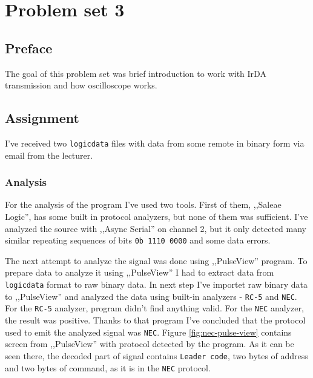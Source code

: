 \section{Problem set 3}
\subsection{Preface}

The goal of this problem set was brief introduction to work with IrDA transmission
and how oscilloscope works.

\subsection{Assignment}

I've received two \texttt{logicdata} files with data from some remote in binary form via email from the lecturer.

\subsubsection{Analysis}

For the analysis of the program I've used two tools. First of them, ,,Saleae Logic'', has some built in protocol analyzers, but none of them was sufficient. I've analyzed the source with ,,Async Serial'' on channel 2, but it only detected many similar repeating sequences of bits \texttt{0b 1110 0000} and some data errors.

The next attempt to analyze the signal was done using ,,PulseView'' program. To prepare data to analyze it using ,,PulseView'' I had to extract data from \texttt{logicdata} format to raw binary data. In next step I've importet raw binary data to ,,PulseView'' and analyzed the data using built-in analyzers - \texttt{RC-5} and \texttt{NEC}. For the \texttt{RC-5} analyzer, program didn't find anything valid. For the \texttt{NEC} analyzer, the result was positive. Thanks to that program I've concluded that the protocol used to emit the analyzed signal was \texttt{NEC}. Figure \ref{fig:nec-pulse-view} contains screen from ,,PulseView'' with protocol detected by the program. As it can be seen there, the decoded part of signal contains \texttt{Leader code}, two bytes of address and two bytes of command, as it is in the \texttt{NEC} protocol.

